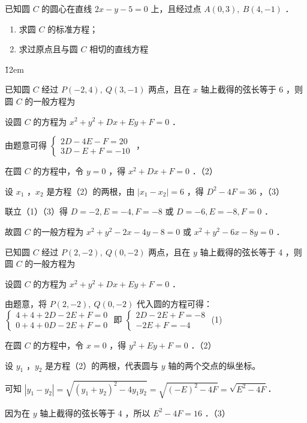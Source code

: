 \begin{example}
    已知圆 $C$ 的圆心在直线 $2 x-y-5=0$ 上，且经过点 $A(0,3), ~ B(4,-1)$ ．
    \begin{enumerate}
        \item 求圆 $C$ 的标准方程；
        \item 求过原点且与圆 $C$ 相切的直线方程
    \end{enumerate}
\end{example}

\v{12em}

\begin{example}
    已知圆 $C$ 经过 $P(-2,4), ~ Q(3,-1)$ 两点，且在 $x$ 轴上截得的弦长等于 6 ，则圆 $C$ 的一般方程为 \underline{\qquad}
\end{example}

\begin{solution}
    设圆 $C$ 的方程为 $x^2+y^2+D x+E y+F=0$ ．

    由题意可得 $\left\{\begin{array}{c}2 D-4 E-F=20 \\ 3 D-E+F=-10\end{array}\right.$ ，

    在圆 $C$ 的方程中，令 $y=0$ ，得 $x^2+D x+F=0$ ．（2）

    设 $x_1$ ，$x_2$ 是方程（2）的两根，由 $\left|x_1-x_2\right|=6$ ，得 $D^2-4 F=36$ ，（3）

    联立（1）（3）得 $D=-2, E=-4, F=-8$ 或 $D=-6, E=-8, F=0$ ．

    故圆 $C$ 的一般方程为 $x^2+y^2-2 x-4 y-8=0$ 或 $x^2+y^2-6 x-8 y=0$ ．
\end{solution}

\begin{example}
    已知圆 $C$ 经过 $P(2,-2), ~ Q(0,-2)$ 两点，且在 $y$ 轴上截得的弦长等于 4 ，则圆 $C$ 的一般方程为 \underline{\qquad\qquad}
\end{example}

\begin{solution}
    设圆 $C$ 的方程为 $x^2+y^2+D x+E y+F=0$ ．

    由题意，将 $P(2,-2), ~ Q(0,-2)$ 代入圆的方程可得：
    $\left\{\begin{array}{l} 4+4+2D-2E+F=0 \\ 0+4+0D-2E+F=0 \end{array}\right.$
    即 $\left\{\begin{array}{l} 2D - 2E + F = -8 \\ -2E + F = -4 \end{array}\right.$ (1)

    在圆 $C$ 的方程中，令 $x=0$ ，得 $y^2+E y+F=0$ ．（2）

    设 $y_1$ ，$y_2$ 是方程（2）的两根，代表圆与 $y$ 轴的两个交点的纵坐标。

    可知 $|y_1-y_2| = \sqrt{(y_1+y_2)^2-4y_1y_2} = \sqrt{(-E)^2-4F} = \sqrt{E^2-4F}$．

    因为在 $y$ 轴上截得的弦长等于 4 ，所以 $E^2-4 F=16$ ．（3）
\end{solution}

